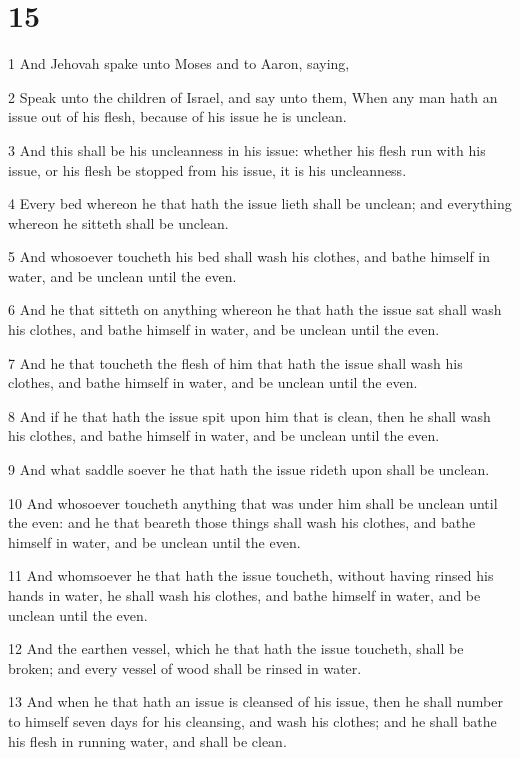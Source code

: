 \chapter{15}

\par 1 And Jehovah spake unto Moses and to Aaron, saying,
\par 2 Speak unto the children of Israel, and say unto them, When any man hath an issue out of his flesh, because of his issue he is unclean.
\par 3 And this shall be his uncleanness in his issue: whether his flesh run with his issue, or his flesh be stopped from his issue, it is his uncleanness.
\par 4 Every bed whereon he that hath the issue lieth shall be unclean; and everything whereon he sitteth shall be unclean.
\par 5 And whosoever toucheth his bed shall wash his clothes, and bathe himself in water, and be unclean until the even.
\par 6 And he that sitteth on anything whereon he that hath the issue sat shall wash his clothes, and bathe himself in water, and be unclean until the even.
\par 7 And he that toucheth the flesh of him that hath the issue shall wash his clothes, and bathe himself in water, and be unclean until the even.
\par 8 And if he that hath the issue spit upon him that is clean, then he shall wash his clothes, and bathe himself in water, and be unclean until the even.
\par 9 And what saddle soever he that hath the issue rideth upon shall be unclean.
\par 10 And whosoever toucheth anything that was under him shall be unclean until the even: and he that beareth those things shall wash his clothes, and bathe himself in water, and be unclean until the even.
\par 11 And whomsoever he that hath the issue toucheth, without having rinsed his hands in water, he shall wash his clothes, and bathe himself in water, and be unclean until the even.
\par 12 And the earthen vessel, which he that hath the issue toucheth, shall be broken; and every vessel of wood shall be rinsed in water.
\par 13 And when he that hath an issue is cleansed of his issue, then he shall number to himself seven days for his cleansing, and wash his clothes; and he shall bathe his flesh in running water, and shall be clean.
